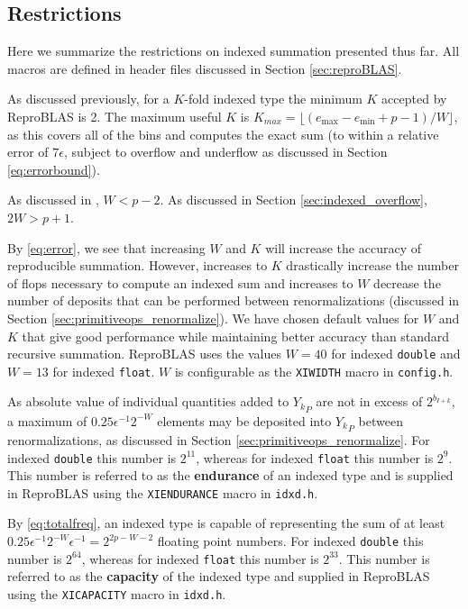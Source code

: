 \subsection{Restrictions}
    \label{sec:primitiveops_restrictions}
    Here we summarize the restrictions on indexed summation presented thus far. All macros are defined in header files discussed in Section \ref{sec:reproBLAS}.

    As discussed previously, for a $K$-fold indexed type the minimum $K$
    accepted by ReproBLAS is 2. The maximum useful $K$ is
    $K_{max}=\lfloor(e_{\max} - e_{\min} + p - 1)/W\rfloor$,
    as this covers all of the bins and computes the exact sum (to within a relative error of $7 \epsilon$, subject to overflow and underflow as discussed in Section \ref{eq:errorbound}).

    As discussed in \cite{repsum}, $W < p - 2$. As discussed in Section
    \ref{sec:indexed_overflow}, $2 W > p + 1$.

    By \eqref{eq:error}, we see that increasing $W$ and $K$ will increase
    the accuracy of reproducible summation. However, increases to $K$ drastically increase the number of flops necessary to compute an indexed sum and increases to $W$ decrease the number of deposits that can be performed between renormalizations (discussed in Section \ref{sec:primitiveops_renormalize}).
    We have chosen default values for $W$ and $K$ that give good performance while maintaining better accuracy than standard recursive summation.
    ReproBLAS uses the values $W = 40$ for indexed \texttt{double} and $W = 13$
    for indexed \texttt{float}. $W$ is configurable as the \texttt{XIWIDTH} macro in \texttt{config.h}.

    As absolute value of individual quantities added to ${Y_k}_P$ are not in
    excess of $2^{b_{I + k}}$, a maximum of $0.25\epsilon^{-1}2^{-W}$ elements
    may be deposited into ${Y_k}_P$ between renormalizations, as discussed in
    Section \ref{sec:primitiveops_renormalize}. For indexed \texttt{double}
    this number is $2^{11}$, whereas for indexed \texttt{float} this number is
    $2^9$. This number is referred to as the \textbf{endurance} of an indexed type and is supplied in ReproBLAS using the
    \texttt{XIENDURANCE} macro in \texttt{idxd.h}.

    By \eqref{eq:totalfreq}, an indexed type is capable of representing the sum
    of at least $0.25\epsilon^{-1}2^{-W}  \epsilon^{-1} = 2^{2  p - W - 2}$
    floating point numbers. For indexed \texttt{double} this number is
    $2^{64}$, whereas for indexed \texttt{float} this number is
    $2^{33}$. This number is referred to as the \textbf{capacity} of the indexed type and supplied in ReproBLAS using the
    \texttt{XICAPACITY} macro in \texttt{idxd.h}.

